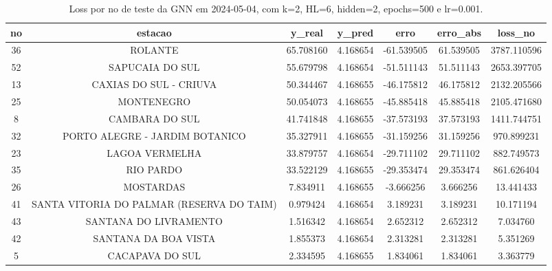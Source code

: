 \begin{table}[h]
\centering
\caption{Loss por no de teste da GNN em 2024-05-04, com k=2, HL=6, hidden=2, epochs=500 e lr=0.001.}
\label{tab:gnn_loss_k2_hl6_h2_e500_d20240504}
\begin{tabular}{ccccccc}
\toprule
no & estacao & y\_real & y\_pred & erro & erro\_abs & loss\_no \\
\midrule
36 & ROLANTE & 65.708160 & 4.168654 & -61.539505 & 61.539505 & 3787.110596 \\
52 & SAPUCAIA DO SUL & 55.679798 & 4.168654 & -51.511143 & 51.511143 & 2653.397705 \\
13 & CAXIAS DO SUL - CRIUVA & 50.344467 & 4.168655 & -46.175812 & 46.175812 & 2132.205566 \\
25 & MONTENEGRO & 50.054073 & 4.168655 & -45.885418 & 45.885418 & 2105.471680 \\
8 & CAMBARA DO SUL & 41.741848 & 4.168655 & -37.573193 & 37.573193 & 1411.744751 \\
32 & PORTO ALEGRE - JARDIM BOTANICO & 35.327911 & 4.168655 & -31.159256 & 31.159256 & 970.899231 \\
23 & LAGOA VERMELHA & 33.879757 & 4.168654 & -29.711102 & 29.711102 & 882.749573 \\
35 & RIO PARDO & 33.522129 & 4.168655 & -29.353474 & 29.353474 & 861.626404 \\
26 & MOSTARDAS & 7.834911 & 4.168655 & -3.666256 & 3.666256 & 13.441433 \\
41 & SANTA VITORIA DO PALMAR (RESERVA DO TAIM) & 0.979424 & 4.168654 & 3.189231 & 3.189231 & 10.171194 \\
43 & SANTANA DO LIVRAMENTO & 1.516342 & 4.168654 & 2.652312 & 2.652312 & 7.034760 \\
42 & SANTANA DA BOA VISTA & 1.855373 & 4.168654 & 2.313281 & 2.313281 & 5.351269 \\
5 & CACAPAVA DO SUL & 2.334595 & 4.168655 & 1.834061 & 1.834061 & 3.363779 \\
\bottomrule
\end{tabular}
\end{table}
